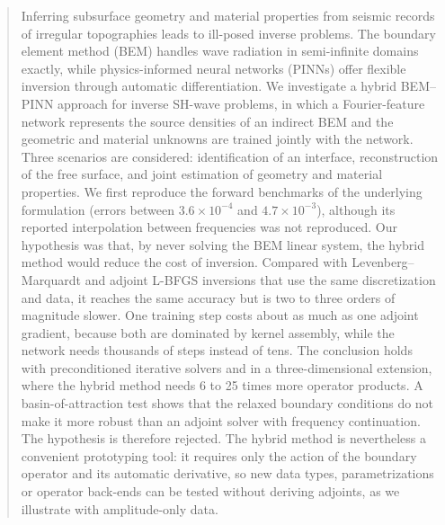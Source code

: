 \documentclass[11pt,twoside]{article}
\begin{document}
\begin{tcolorbox}[colback=gray!20, colframe=gray!20, sharp corners]
    \begin{abstract}
        \vspace{-1mm}
        \noindent
Inferring subsurface geometry and material properties from seismic records of irregular topographies leads to ill-posed inverse problems. The boundary element method (BEM) handles wave radiation in semi-infinite domains exactly, while physics-informed neural networks (PINNs) offer flexible inversion through automatic differentiation. We investigate a hybrid BEM–PINN approach for inverse SH-wave problems, in which a Fourier-feature network represents the source densities of an indirect BEM and the geometric and material unknowns are trained jointly with the network. Three scenarios are considered: identification of an interface, reconstruction of the free surface, and joint estimation of geometry and material properties. We first reproduce the forward benchmarks of the underlying formulation (errors between $3.6\times10^{-4}$ and $4.7\times10^{-3}$), although its reported interpolation between frequencies was not reproduced. Our hypothesis was that, by never solving the BEM linear system, the hybrid method would reduce the cost of inversion. Compared with Levenberg–Marquardt and adjoint L-BFGS inversions that use the same discretization and data, it reaches the same accuracy but is two to three orders of magnitude slower. One training step costs about as much as one adjoint gradient, because both are dominated by kernel assembly, while the network needs thousands of steps instead of tens. The conclusion holds with preconditioned iterative solvers and in a three-dimensional extension, where the hybrid method needs 6 to 25 times more operator products. A basin-of-attraction test shows that the relaxed boundary conditions do not make it more robust than an adjoint solver with frequency continuation. The hypothesis is therefore rejected. The hybrid method is nevertheless a convenient prototyping tool: it requires only the action of the boundary operator and its automatic derivative, so new data types, parametrizations or operator back-ends can be tested without deriving adjoints, as we illustrate with amplitude-only data.
        \end{abstract}
\end{tcolorbox}
\end{document}
